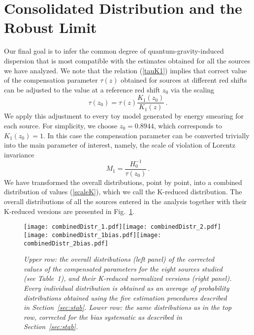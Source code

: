 \documentclass[12pt]{article}
\newcommand{\beq}{\begin{equation}}
\newcommand{\eeq}{\end{equation}}
\begin{document}
{\section{Consolidated Distribution and the Robust Limit
\label{sec:consol}}

Our final goal is to infer the common degree of quantum-gravity-induced dispersion that is most compatible
with the estimates obtained for all the sources we have analyzed.
We note that the relation (\ref{tauK1}) implies that correct value of the compensation
parameter $\tau (z)$ obtained for sources at different red shifts
can be adjusted to the value at a reference red shift $z_0$ via the scaling
\beq
\label{scaleK}
\tau (z_0) = \tau (z)\frac{K_1(z_0)}{K_1(z)} \, .
\eeq
We apply this adjustment to every toy model generated by energy smearing for each source. For simplicity,
we choose $z_0 = 0.8944$, which corresponds to $K_1(z_0)=1$. In this case the compensation parameter can be
converted trivially into the main parameter of interest, namely, the scale of violation of Lorentz invariance
\beq
\label{mQGtau}
M_1=\frac{H_0^{-1}}{\tau (z_0)} \, .
\eeq
We have transformed the overall distributions, point by point, into a combined distribution
of values (\ref{scaleK}), which we call the K-reduced distribution. The overall distributions of all the sources entered in the analysis
together with their K-reduced versions are presented in Fig.~\ref{fig:COMB1}.

\begin{figure}
\centering
\texttt{[image: combinedDistr\_1.pdf]}\hspace{0cm}\texttt{[image: combinedDistr\_2.pdf]}
\texttt{[image: combinedDistr\_1bias.pdf]}\hspace{0cm}\texttt{[image: combinedDistr\_2bias.pdf]}
\vspace{-0.4cm}
\caption{\it Upper row: the overall distributions (left panel) of the corrected values of the compensated parameters for the
eight sources studied (see Table~1), and their K-reduced normalized versions (right panel). Every individual distribution is obtained as an average of
probability distributions obtained using the five estimation procedures described in Section~\ref{sec:stab}. Lower row: the same
distributions as in the top row, corrected for the bias systematic as described in Section~\ref{sec:stab}.
}
\label{fig:COMB1}
\end{figure}

}
\end{document}
